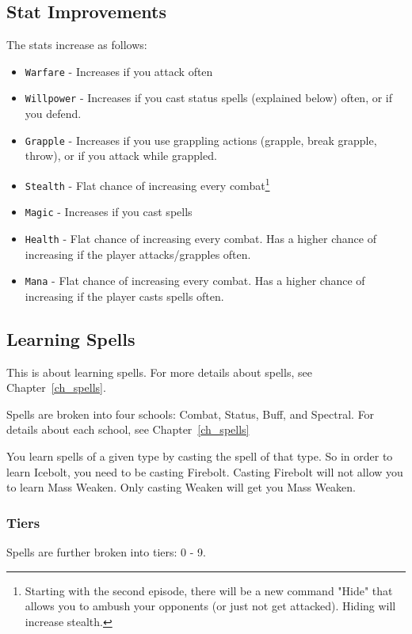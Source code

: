 \documentclass{report}
\begin{document}
\subsection{Stat Improvements}
The stats increase as follows:
\begin{itemize}
    \item \verb|Warfare| - Increases if you attack often
    \item \verb|Willpower| - Increases if you cast status spells (explained below) often, or if you defend.
    \item \verb|Grapple| - Increases if you use grappling actions 
    (grapple, break grapple, throw), or if you attack while grappled.
    \item \verb|Stealth| - Flat chance of increasing every combat\footnote{
Starting with the second episode, there will be a new command "Hide" that allows you to ambush your opponents (or just not get attacked). Hiding will increase stealth.}
    \item \verb|Magic| - Increases if you cast spells
    \item \verb|Health| - Flat chance of increasing every combat. Has a higher
    chance of increasing if the player attacks/grapples often.
    \item \verb|Mana| - Flat chance of increasing every combat. Has a higher
    chance of increasing if the player casts spells often.
\end{itemize}


\subsection{Learning Spells}

This is about learning spells. For more details about spells, see Chapter~\ref{ch_spells}.

Spells are broken into four schools: Combat, Status, Buff, and Spectral. For 
details about each school, see Chapter~\ref{ch_spells}


You learn spells of a given type by casting the spell of that type. So in order to learn Icebolt, you need to be casting Firebolt.  Casting Firebolt will not allow you to learn Mass Weaken. Only casting Weaken will get you Mass Weaken.

\subsubsection{Tiers}
Spells are further broken into tiers: 0 - 9.
\end{document}
